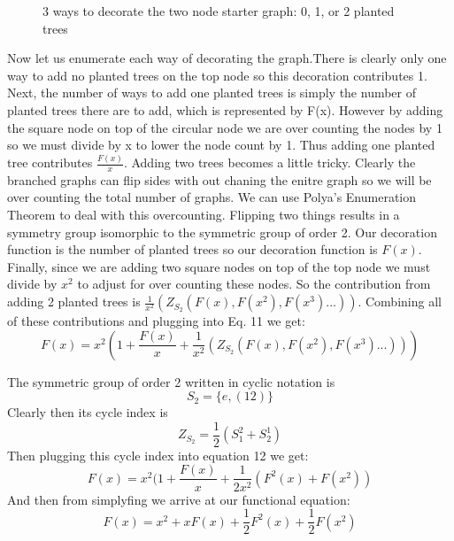 \documentclass{article}
\begin{document}
\begin{figure}[!h]
\centering
{}
\caption{3 ways to decorate the two node starter graph: 0, 1, or 2 planted trees}
\end{figure}

Now let us enumerate each way of decorating the graph.There is clearly only one way to add no planted trees on the top node so this decoration contributes 1. Next, the number of ways to add one planted trees is simply the number of planted trees there are to add, which is represented by F(x). However by adding the square node on top of the circular node we are over counting the nodes by 1 so we must divide by x to lower the node count by 1. Thus adding one planted tree contributes \(\frac{F(x)}{x}\). Adding two trees becomes a little tricky. Clearly the branched graphs can flip sides with out chaning the enitre graph so we will be over counting the total number of graphs. We can use Polya's Enumeration Theorem to deal with this overcounting. Flipping two things results in a symmetry group isomorphic to the symmetric group of order 2. Our decoration function is the number of planted trees so our decoration function is \(F(x)\). Finally, since we are adding two square nodes on top of the top node we must divide by \(x^2\) to adjust for over counting these nodes. So the contribution from adding 2 planted trees is \(\frac{1}{x^2}(Z_{S_2}(F(x),F(x^2),F(x^3)...))\). Combining all of these contributions and plugging into Eq. 11 we get:
\begin{equation}
F(x)=x^2(1+\frac{F(x)}{x}+\frac{1}{x^2}(Z_{S_2}(F(x),F(x^2),F(x^3)...)))
\end{equation}
 
The symmetric group of order 2 written in cyclic notation is 
\begin{equation}
S_2=\{e,(12)\}
\end{equation}
Clearly then its cycle index is 
\begin{equation}
Z_{S_2}=\frac{1}{2}(S_1^2+S_2^1)
\end{equation}
Then plugging this cycle index into equation 12 we get:
\begin{equation}
F(x)=x^2(1+\frac{F(x)}{x}+\frac{1}{2x^2}(F^2(x)+F(x^2))
\end{equation}
And then from simplyfing we arrive at our functional equation:
\begin{equation}
F(x)=x^2+ xF(x)+\frac{1}{2}F^2(x)+\frac{1}{2}F(x^2)
\end{equation}
\end{document}
